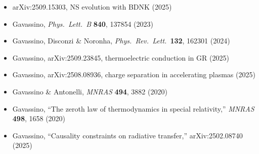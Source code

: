 \begin{itemize}
    A74 (2018) \citep{PotekhinChabrier2018}
  \item arXiv:2509.15303, NS evolution with BDNK (2025)
    \citep{NSevolutionBDNK2025}
  \item Gavassino, \textit{Phys.\ Lett.\ B} \textbf{840}, 137854
    (2023) \citep{GavassinoBounds2023}
  \item Gavassino, Disconzi \& Noronha, \textit{Phys.\ Rev.\ Lett.}\
    \textbf{132}, 162301 (2024) \citep{GavassinoDispersions2024}
  \item Gavassino, arXiv:2509.23845, thermoelectric conduction in GR
    (2025) \citep{GavassinoThermoelectric2025}
  \item Gavassino, arXiv:2508.08936, charge separation in accelerating
    plasmas (2025) \citep{GavassinoChargeSeparation2025}
  \item Gavassino \& Antonelli, \textit{MNRAS} \textbf{494},
    3882 (2020) \citep{GavassinoAntonelliMultifluidThermo2019}
  \item Gavassino, ``The zeroth law of thermodynamics in special
    relativity,'' \textit{MNRAS} \textbf{498}, 1658 (2020)
    \citep{GavassinoZerothLaw2020}
  \item Gavassino, ``Causality constraints on radiative transfer,''
    arXiv:2502.08740 (2025) \citep{GavassinoCausalRadTransfer2025}
\end{itemize}
